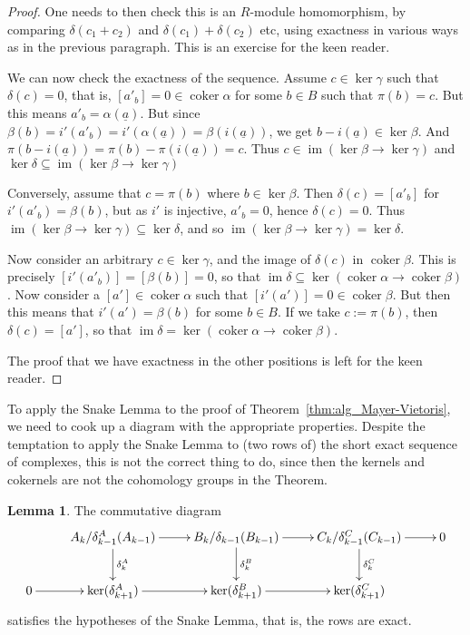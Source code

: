 \documentclass{tufte-handout}
\DeclareMathOperator{\coker}{coker}
\DeclareMathOperator{\im}{im}
\theoremstyle{definition}
\newtheorem{lemma}{Lemma}
\begin{document}
\begin{proof}
One needs to then check this is an $R$-module homomorphism, by comparing 
$\delta(c_1+c_2)$ and $\delta(c_1) + \delta(c_2)$ etc, using exactness in various ways as in 
the previous paragraph. This is an exercise for the keen reader.

We can now check the exactness of the sequence. Assume $c\in \ker \gamma$ such that 
$\delta(c)=0$, that is, $[a'_b] = 0 \in \coker\alpha$ for some $b\in B$ such that 
$\pi(b)=c$. But this means $a'_b = \alpha(\underline{a})$. But since $\beta(b) = 
i'(a'_b) = i'(\alpha(\underline{a})) = \beta(i(\underline{a}))$, we get $b - 
i(\underline{a}) \in \ker\beta$. And $\pi(b - i(\underline{a})) = \pi(b) - 
\pi(i(\underline{a})) = c$. Thus $c\in \im(\ker \beta \to \ker \gamma)$ and $\ker\delta 
\subseteq \im(\ker \beta \to \ker \gamma)$

Conversely, assume that $c = \pi(b)$ where $b\in \ker\beta$. Then $\delta(c) = [a'_b]$ 
for $i'(a'_b) = \beta(b)$, but as $i'$ is injective, $a'_b = 0$, hence $\delta(c)=0$. 
Thus $\im(\ker \beta \to \ker \gamma)\subseteq \ker\delta$, and so $\im(\ker \beta \to 
\ker \gamma)= \ker\delta$.

Now consider an arbitrary $c\in \ker\gamma$, and the image of $\delta(c)$ in 
$\coker\beta$. This is precisely $[i'(a'_b)] = [\beta(b)] = 0$, so that $\im\delta 
\subseteq \ker(\coker\alpha \to \coker\beta)$. Now consider a $[a']\in \coker\alpha$ 
such that $[i'(a')]=0 \in \coker\beta$. But then this means that $i'(a') = \beta(b)$ for 
some $b\in B$. If we take $c:= \pi(b)$, then $\delta(c) = [a']$, so that $\im\delta
=\ker(\coker\alpha \to \coker\beta)$.

The proof that we have exactness in the other positions is left for the keen reader.
\end{proof}

To apply the Snake Lemma to the proof of Theorem~\ref{thm:alg_Mayer-Vietoris}, we need 
to cook up a diagram with the appropriate properties. Despite the temptation to apply 
the Snake Lemma to (two rows of) the short exact sequence of complexes, this is not the 
correct thing to do, since then the kernels and cokernels are not the cohomology groups 
in the Theorem.

\begin{lemma}\label{lemma:setup_for_algMV}
The commutative diagram
\[
	\xymatrix{
	&A_k/\delta_{k-1}^A(A_{k-1}) \ar[r] \ar[d]^{\delta_k^A} & B_k/\delta_{k-1}(B_{k-1}) 
	\ar[r] \ar[d]^{\delta_k^B} & C_k/\delta_{k-1}^C(C_{k-1}) \ar[r] \ar[d]^{\delta_k^C} & 0\\
	0\ar[r] & \ker(\delta_{k+1}^A) \ar[r]& \ker(\delta_{k+1}^B) \ar[r] & \ker(\delta_{k+1}^C)	
	}
\]
satisfies the hypotheses of the Snake Lemma, that is, the rows are exact.
\end{lemma}
\end{document}
